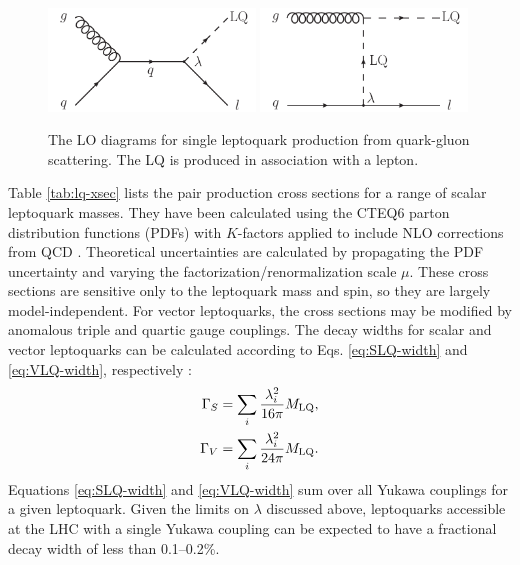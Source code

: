 \begin{figure}[hbt]
\begin{center}
\includegraphics[width=0.49\textwidth]{figures/LO_FD_single_LQ_a.pdf}
\includegraphics[width=0.49\textwidth]{figures/LO_FD_single_LQ_b.pdf}
\caption{The LO diagrams for single leptoquark production from quark-gluon scattering. The LQ is produced in association with a lepton.}
\label{fig:lq-single}
\end{center}
\end{figure}

Table \ref{tab:lq-xsec} lists the pair production cross sections for a range of scalar leptoquark masses. They have been calculated using the CTEQ6 parton distribution functions (PDFs) \cite{CTEQ6r1,CTEQ6r2} with $K$-factors applied to include NLO corrections from QCD \cite{LQxsec}. Theoretical uncertainties are calculated by propagating the PDF uncertainty and varying the factorization/renormalization scale $\mu$. These cross sections are sensitive only to the leptoquark mass and spin, so they are largely model-independent. For vector leptoquarks, the cross sections may be modified by anomalous triple and quartic gauge couplings. The decay widths for scalar and vector leptoquarks can be calculated according to Eqs. \eqref{eq:SLQ-width} and \eqref{eq:VLQ-width}, respectively \cite{BRW}:
\begin{align}
\label{eq:SLQ-width} \Gamma_{S} &= \sum_{i}{\frac{\lambda_{i}^{2}}{16\pi}M_{\text{LQ}}}, \\
\label{eq:VLQ-width} \Gamma_{V} &= \sum_{i}{\frac{\lambda_{i}^{2}}{24\pi}M_{\text{LQ}}}.
\end{align}
Equations \eqref{eq:SLQ-width} and \eqref{eq:VLQ-width} sum over all Yukawa couplings for a given leptoquark. Given the limits on $\lambda$ discussed above, leptoquarks accessible at the LHC with a single Yukawa coupling can be expected to have a fractional decay width of less than 0.1--0.2\%.

